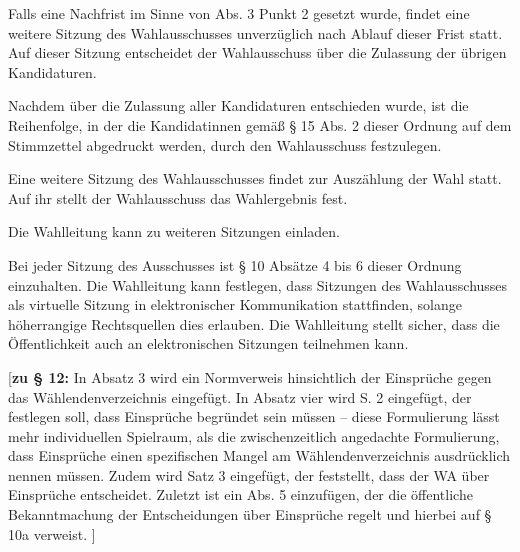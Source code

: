 \documentclass[%
draft,%
multilinesections%
]{fswo}
\newcommand\bemFr[1]{{\color{Red}[#1]}}
\newcommand\bemFr[1]{}%
\begin{document}
\begin{contract}
Falls eine Nachfrist im Sinne von Abs. 3 Punkt 2 gesetzt wurde, findet eine weitere Sitzung des Wahlausschusses unverzüglich nach Ablauf dieser Frist statt.
Auf dieser Sitzung entscheidet der Wahlausschuss über die Zulassung der übrigen Kandidaturen.

Nachdem über die Zulassung aller Kandidaturen entschieden wurde, ist die Reihenfolge, in der die Kandidatinnen gemäß § 15 Abs. 2 dieser Ordnung auf dem Stimmzettel abgedruckt werden, durch den Wahlausschuss festzulegen.

Eine weitere Sitzung des Wahlausschusses findet zur Auszählung der Wahl statt. Auf ihr stellt der Wahlausschuss das Wahlergebnis fest.

Die Wahlleitung kann zu weiteren Sitzungen einladen.

Bei jeder Sitzung des Ausschusses ist § 10 Absätze 4 bis 6 dieser Ordnung einzuhalten.
Die Wahlleitung kann festlegen, dass Sitzungen des Wahlausschusses als virtuelle Sitzung in elektronischer Kommunikation stattfinden, solange höherrangige Rechtsquellen dies erlauben.
Die Wahlleitung stellt sicher, dass die Öffentlichkeit auch an elektronischen Sitzungen teilnehmen kann.
\end{contract}

\bemFr{\textbf{zu § 12:}
In Absatz 3 wird ein Normverweis hinsichtlich der Einsprüche gegen das Wählendenverzeichnis eingefügt.
In Absatz vier wird S. 2 eingefügt, der festlegen soll, dass Einsprüche begründet sein müssen
– diese Formulierung lässt mehr individuellen Spielraum, als die zwischenzeitlich angedachte Formulierung,
dass Einsprüche einen spezifischen Mangel am Wählendenverzeichnis ausdrücklich nennen müssen.
Zudem wird Satz 3 eingefügt, der feststellt, dass der WA über Einsprüche entscheidet.
Zuletzt ist ein Abs. 5 einzufügen, der die öffentliche Bekanntmachung der Entscheidungen über Einsprüche regelt und hierbei auf § 10a verweist.
}
\end{document}

